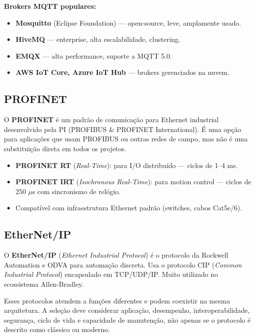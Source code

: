 \textbf{Brokers MQTT populares:}

\begin{itemize}
\tightlist
\item
  \textbf{Mosquitto} (Eclipse Foundation) --- open-source, leve, amplamente usado.
\item
  \textbf{HiveMQ} --- enterprise, alta escalabilidade, clustering.
\item
  \textbf{EMQX} --- alta performance, suporte a MQTT 5.0.
\item
  \textbf{AWS IoT Core, Azure IoT Hub} --- brokers gerenciados na nuvem.
\end{itemize}

\subsection{PROFINET}\label{profinet}

O \textbf{PROFINET} é um padrão de comunicação para Ethernet industrial desenvolvido pela PI (PROFIBUS \& PROFINET International). É uma opção para aplicações que usam PROFIBUS ou outras redes de campo, mas não é uma substituição direta em todos os projetos.

\begin{itemize}
\tightlist
\item
  \textbf{PROFINET RT} (\emph{Real-Time}): para I/O distribuído --- ciclos de 1--4 ms.
\item
  \textbf{PROFINET IRT} (\emph{Isochronous Real-Time}): para motion control --- ciclos de 250 \ensuremath{\mu}s com sincronismo de relógio.
\item
  Compatível com infraestrutura Ethernet padrão (switches, cabos Cat5e/6).
\end{itemize}

\subsection{EtherNet/IP}\label{ethernetip}

O \textbf{EtherNet/IP} (\emph{Ethernet Industrial Protocol}) é o protocolo da Rockwell Automation e ODVA para automação discreta. Usa o protocolo CIP (\emph{Common Industrial Protocol}) encapsulado em TCP/UDP/IP. Muito utilizado no ecossistema Allen-Bradley.

Esses protocolos atendem a funções diferentes e podem coexistir na mesma arquitetura. A seleção
deve considerar aplicação, desempenho, interoperabilidade, segurança, ciclo de vida e capacidade
de manutenção, não apenas se o protocolo é descrito como clássico ou moderno.

